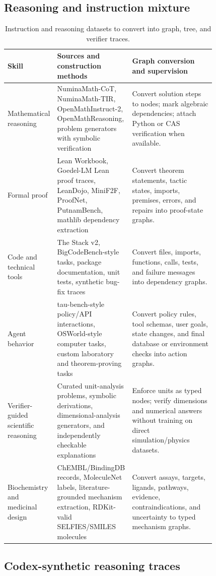 \documentclass[11pt]{article}
\newcommand{\1}{\mathbf{1}}
\begin{document}
\subsection{Reasoning and instruction mixture}

\begin{longtable}{p{0.18\linewidth}p{0.24\linewidth}p{0.40\linewidth}}
\caption{Instruction and reasoning datasets to convert into graph, tree, and verifier traces.}\label{tab:reasoning-sources}\\
\toprule
Skill & Sources and construction methods & Graph conversion and supervision\\
\midrule
Mathematical reasoning & NuminaMath-CoT, NuminaMath-TIR, OpenMathInstruct-2, OpenMathReasoning, problem generators with symbolic verification & Convert solution steps to nodes; mark algebraic dependencies; attach Python or CAS verification when available.\\
Formal proof & Lean Workbook, Goedel-LM Lean proof traces, LeanDojo, MiniF2F, ProofNet, PutnamBench, mathlib dependency extraction & Convert theorem statements, tactic states, imports, premises, errors, and repairs into proof-state graphs.\\
Code and technical tools & The Stack v2, BigCodeBench-style tasks, package documentation, unit tests, synthetic bug-fix traces & Convert files, imports, functions, calls, tests, and failure messages into dependency graphs.\\
Agent behavior & tau-bench-style policy/API interactions, OSWorld-style computer tasks, custom laboratory and theorem-proving tasks & Convert policy rules, tool schemas, user goals, state changes, and final database or environment checks into action graphs.\\
Verifier-guided scientific reasoning & Curated unit-analysis problems, symbolic derivations, dimensional-analysis generators, and independently checkable explanations & Enforce units as typed nodes; verify dimensions and numerical answers without training on direct simulation/physics datasets.\\
Biochemistry and medicinal design & ChEMBL/BindingDB records, MoleculeNet labels, literature-grounded mechanism extraction, RDKit-valid SELFIES/SMILES molecules & Convert assays, targets, ligands, pathways, evidence, contraindications, and uncertainty to typed mechanism graphs.\\
\bottomrule
\end{longtable}

\subsection{Codex-synthetic reasoning traces}
\end{document}
